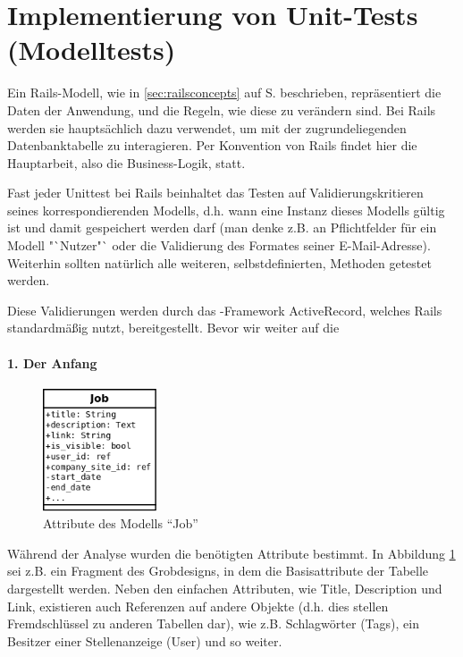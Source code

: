 \section{Implementierung von Unit-Tests (Modelltests)}    
\label{sec:awunit}

Ein Rails-Modell, wie in \ref{sec:railsconcepts} auf S. \pageref{sec:railsconcepts} beschrieben, repräsentiert die Daten der Anwendung, und die Regeln, wie diese zu verändern sind. Bei Rails werden sie hauptsächlich dazu verwendet, um mit der zugrundeliegenden Datenbanktabelle zu interagieren. Per Konvention von Rails findet hier die Hauptarbeit, also die Business-Logik, statt.

Fast jeder Unittest bei Rails beinhaltet das Testen auf Validierungskritieren seines korrespondierenden Modells, d.h. wann eine Instanz dieses Modells gültig ist und damit gespeichert werden darf (man denke z.B. an Pflichtfelder für ein Modell "`Nutzer"` oder die Validierung des Formates seiner E-Mail-Adresse). Weiterhin sollten natürlich alle weiteren, selbstdefinierten, Methoden getestet werden.

Diese Validierungen werden durch das -Framework ActiveRecord, welches Rails standardmäßig nutzt, bereitgestellt. Bevor wir weiter auf die 

\paragraph{1. Der Anfang}
\begin{figure}[htbp]
 \centering

 \includegraphics[width=0.3\textwidth]{./diagrams/job-erm.png}
 \caption{Attribute des Modells "`Job"'}
  \label{fig:job-erm}
\end{figure}

Während der Analyse wurden die benötigten Attribute bestimmt. In Abbildung \ref{fig:job-erm} sei z.B. ein Fragment des Grobdesigns, in dem die Basisattribute der Tabelle dargestellt werden. Neben den einfachen Attributen, wie Title, Description und Link, existieren auch Referenzen auf andere Objekte (d.h. dies stellen Fremdschlüssel zu anderen Tabellen dar), wie z.B. Schlagwörter (Tags), ein Besitzer einer Stellenanzeige (User) und so weiter.

